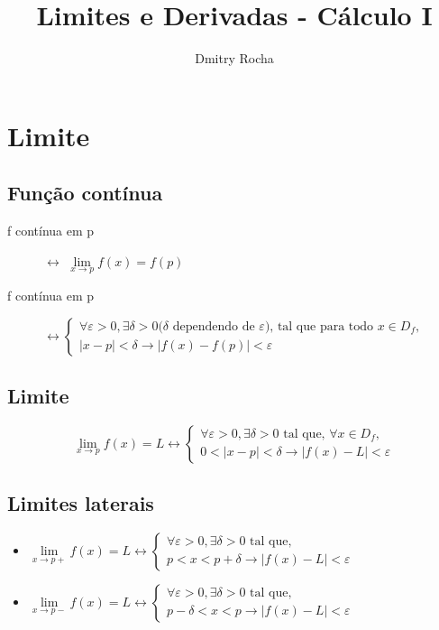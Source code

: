 \documentclass[11pt]{article}
\author{Dmitry Rocha}
\title{Limites e Derivadas - Cálculo I}
\newcommand{\limit}[3]{{
  \underset{#1 \rightarrow #2}{\lim} #3
}}
\begin{document}
\section{Limite}

\subsection{Função contínua}

\begin{description}
  \item[f contínua em p] $\leftrightarrow$
    $\underset{x\rightarrow p}{\lim } f(x) = f(p)$

  \item[f contínua em p]

    $
    \leftrightarrow
      \begin{cases}
        \forall \varepsilon > 0, \exists \delta > 0 (\delta\text{ dependendo de }
        \varepsilon\text{), tal que para todo }x \in D_f, \\
        |x-p| < \delta \to |f(x) - f(p)| < \varepsilon
      \end{cases}
    $

\end{description}

\subsection{Limite}

$$
\limit{x}{p}{f(x)} = L \leftrightarrow
  \begin{cases}
    \forall \varepsilon > 0 , \exists \delta > 0\text{ tal que, }\forall x \in D_f, \\
    0< |x-p| < \delta \to |f(x) - L| < \varepsilon
  \end{cases}
$$

\subsection{Limites laterais}

\begin{itemize}
\item
$
\limit{x}{p+}{f(x)} = L \leftrightarrow
  \begin{cases}
    \forall \varepsilon > 0 , \exists \delta > 0\text{ tal que, } \\
    p < x < p+\delta \to |f(x) - L| < \varepsilon
  \end{cases}
$

\item
$
\limit{x}{p-}{f(x)} = L \leftrightarrow
  \begin{cases}
    \forall \varepsilon > 0 , \exists \delta > 0\text{ tal que, } \\
    p - \delta < x < p \to |f(x) - L| < \varepsilon
  \end{cases}
$
\end{itemize}
\end{document}
